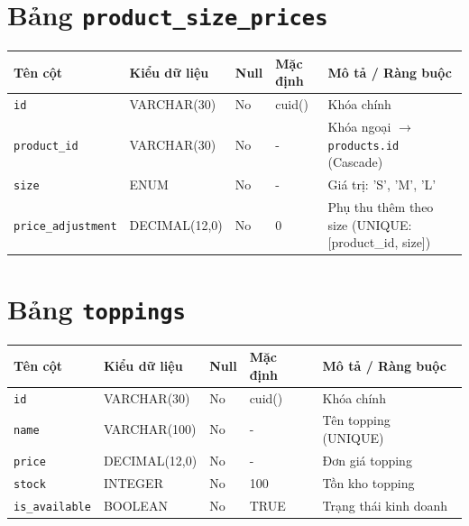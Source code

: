 \documentclass[12pt,a4paper,oneside]{report}
\begin{document}
\section{Bảng \texttt{product\_size\_prices}}
\begin{table}[H]
\centering
\small
\begin{tabularx}{\textwidth}{llllX}
\toprule
\textbf{Tên cột} & \textbf{Kiểu dữ liệu} & \textbf{Null} & \textbf{Mặc định} & \textbf{Mô tả / Ràng buộc} \\
\midrule
\texttt{id} & VARCHAR(30) & No & cuid() & Khóa chính \\
\texttt{product\_id} & VARCHAR(30) & No & - & Khóa ngoại \(\to\) \texttt{products.id} (Cascade) \\
\texttt{size} & ENUM & No & - & Giá trị: 'S', 'M', 'L' \\
\texttt{price\_adjustment} & DECIMAL(12,0) & No & 0 & Phụ thu thêm theo size (UNIQUE:[product\_id, size]) \\
\bottomrule
\end{tabularx}
\end{table}

\section{Bảng \texttt{toppings}}
\begin{table}[H]
\centering
\small
\begin{tabularx}{\textwidth}{llllX}
\toprule
\textbf{Tên cột} & \textbf{Kiểu dữ liệu} & \textbf{Null} & \textbf{Mặc định} & \textbf{Mô tả / Ràng buộc} \\
\midrule
\texttt{id} & VARCHAR(30) & No & cuid() & Khóa chính \\
\texttt{name} & VARCHAR(100) & No & - & Tên topping (UNIQUE) \\
\texttt{price} & DECIMAL(12,0) & No & - & Đơn giá topping \\
\texttt{stock} & INTEGER & No & 100 & Tồn kho topping \\
\texttt{is\_available} & BOOLEAN & No & TRUE & Trạng thái kinh doanh \\
\bottomrule
\end{tabularx}
\end{table}
\end{document}
